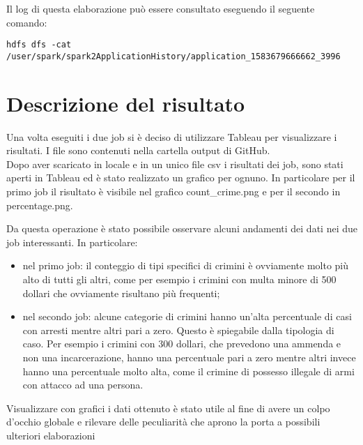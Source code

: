 \documentclass[10pt]{article}
\begin{document}
Il log di questa elaborazione può essere consultato eseguendo il seguente comando:
\begin{lstlisting}
hdfs dfs -cat /user/spark/spark2ApplicationHistory/application_1583679666662_3996
\end{lstlisting}


\section{Descrizione del risultato}
Una volta eseguiti i due job si è deciso di utilizzare Tableau per visualizzare i risultati. I file sono contenuti nella cartella output di GitHub. \\
Dopo aver scaricato in locale e in un unico file csv i risultati dei job, sono stati aperti in Tableau ed è stato realizzato un grafico per ognuno. In particolare per il primo job il risultato è visibile nel grafico count\_crime.png e per il secondo in percentage.png.

Da questa operazione è stato possibile osservare alcuni andamenti dei dati nei due job interessanti. In particolare:
\begin{itemize}
\item nel primo job: il conteggio di tipi specifici di crimini è ovviamente molto più alto di tutti gli altri, come per esempio i crimini con multa minore di 500 dollari che ovviamente risultano più frequenti;
\item nel secondo job: alcune categorie di crimini hanno un'alta percentuale di casi con arresti mentre altri pari a zero. Questo è spiegabile dalla tipologia di caso. Per esempio i crimini con 300 dollari, che prevedono una ammenda e non una incarcerazione, hanno una percentuale pari a zero mentre altri invece hanno una percentuale molto alta, come il crimine di possesso illegale di armi con attacco ad una persona.
\end{itemize}
Visualizzare con grafici i dati ottenuto è stato utile al fine di avere un colpo d'occhio globale e rilevare delle peculiarità che aprono la porta a possibili ulteriori elaborazioni
\end{document}
